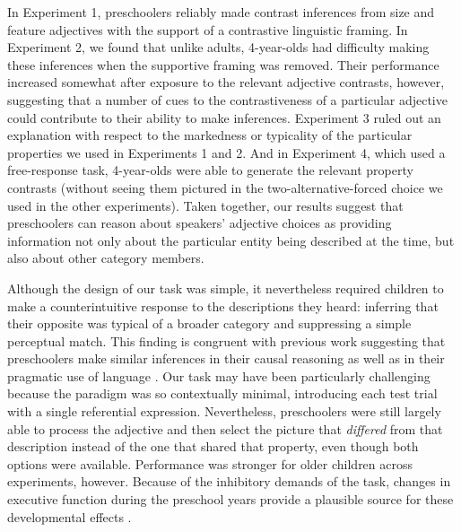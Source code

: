 \documentclass[man]{apa2}
\begin{document}
In Experiment 1, preschoolers reliably made contrast inferences from size and feature adjectives with the support of a contrastive linguistic framing.  In Experiment 2, we found that unlike adults, 4-year-olds had difficulty making these inferences when the supportive framing was removed. Their performance increased somewhat after exposure to the relevant adjective contrasts, however, suggesting that a number of cues to the contrastiveness of a particular adjective could contribute to their ability to make inferences. Experiment 3 ruled out an explanation with respect to the markedness or typicality of the particular properties we used in Experiments 1 and 2. And in Experiment 4, which used a free-response task, 4-year-olds were able to generate the relevant property contrasts (without seeing them pictured in the two-alternative-forced choice we used in the other experiments). Taken together, our results suggest that preschoolers can reason about speakers' adjective choices as providing information not only about the particular entity being described at the time, but also about other category members. 

Although the design of our task was simple, it nevertheless required children to make a counterintuitive response to the descriptions they heard: inferring that their opposite was typical of a broader category and suppressing a simple perceptual match. This finding is congruent with previous work suggesting that preschoolers make similar inferences in their causal reasoning \cite{harris1996} as well as in their pragmatic use of language \cite{barner2011,stiller2014}. Our task may have been particularly challenging because the paradigm was so contextually minimal, introducing each test trial with a single referential expression. Nevertheless, preschoolers were still largely able to process the adjective and then select the picture that \emph{differed} from that description instead of the one that shared that property, even though both options were available. Performance was stronger for older children across experiments, however. Because of the inhibitory demands of the task, changes in executive function during the preschool years provide a plausible source for these developmental effects \cite{davidson2006,zelazo2003}. 

\end{document}
